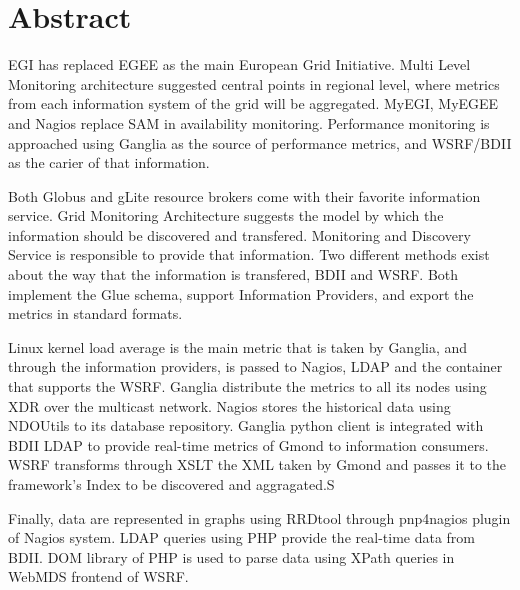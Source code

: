 \section*{Abstract}

EGI has replaced EGEE as the main European Grid Initiative. Multi Level Monitoring architecture suggested central points in regional level, where metrics from each information system of the grid will be aggregated. MyEGI, MyEGEE and Nagios replace SAM in availability monitoring. Performance monitoring is approached using Ganglia as the source of performance metrics, and WSRF/BDII as the carier of that information.

Both Globus and gLite resource brokers come with their favorite information service. Grid Monitoring Architecture suggests the model by which the information should be discovered and transfered. Monitoring and Discovery Service is responsible to provide that information. Two different methods exist about the way that the information is transfered, BDII and WSRF. Both implement the Glue schema, support Information Providers, and export the metrics in standard formats.

Linux kernel load average is the main metric that is taken by Ganglia, and through the information providers, is passed to Nagios, LDAP and the container that supports the WSRF. Ganglia distribute the metrics to all its nodes using XDR over the multicast network. Nagios stores the historical data using NDOUtils to its database repository. Ganglia python client is integrated with BDII LDAP to provide real-time metrics of Gmond to information consumers. WSRF transforms through XSLT the XML taken by Gmond and passes it to the framework's Index to be discovered and aggragated.S

Finally, data are represented in graphs using RRDtool through pnp4nagios plugin of Nagios system. LDAP queries using PHP provide the real-time data from BDII. DOM library of PHP is used to parse data using XPath queries in WebMDS frontend of WSRF.

\newpage
